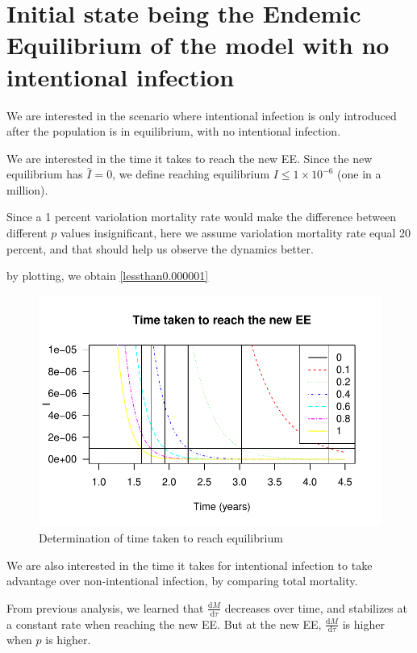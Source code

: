 \documentclass[12pt]{article}
\newcommand\dbyd[2]{\frac{\mathrm d{#1}}{\mathrm d{#2}}}
\begin{document}
\section{Initial state being the Endemic Equilibrium of the model with no intentional infection}

We are interested in the scenario where intentional infection is only introduced after the population is in equilibrium, with no intentional infection.

We are interested in the time it takes to reach the new EE. Since the new equilibrium has $\hat{I}=0$, we define reaching equilibrium $I\leq 1\times 10^{-6}$ (one in a million).

Since a 1 percent variolation mortality rate would make the difference between different $p$ values insignificant, here we assume variolation mortality rate equal 20 percent, and that should help us observe the dynamics better.

by plotting, we obtain \autoref{lessthan0.000001}
\begin{figure}[H]
  \centering
  \includegraphics[width=1.1\textwidth]{Figures/I_less_than_0_000001.pdf}
  \caption{Determination of time taken to reach equilibrium}
\label{lessthan0.000001}
\end{figure}

We are also interested in the time it takes for intentional infection to take advantage over non-intentional infection, by comparing total mortality.

From previous analysis, we learned that $\dbyd{M}{\tau}$ decreases over time, and stabilizes at a constant rate when reaching the new EE. But at the new EE, $\dbyd{M}{\tau}$ is higher when $p$ is higher. 
\end{document}
